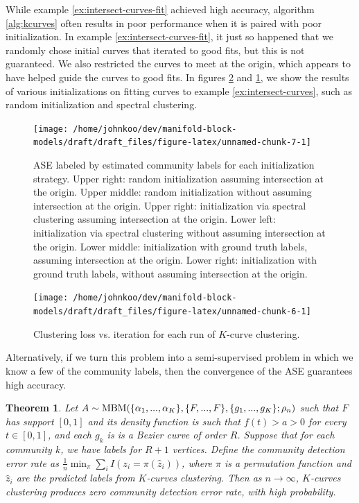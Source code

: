 \documentclass[
  11pt,
]{article}
\newtheorem{theorem}{Theorem}[section]
\theoremstyle{definition}
\theoremstyle{definition}
\theoremstyle{definition}
\theoremstyle{definition}
\theoremstyle{remark}
\begin{document}
While example \ref{ex:intersect-curves-fit} achieved high accuracy, algorithm \ref{alg:kcurves} often results in poor performance when it is paired with poor initialization.
In example \ref{ex:intersect-curves-fit}, it just so happened that we randomly chose initial curves that iterated to good fits, but this is not guaranteed.
We also restricted the curves to meet at the origin, which appears to have helped guide the curves to good fits.
In figures \ref{fig:loss} and \ref{fig:init-strategies}, we show the results of various initializations on fitting curves to example \ref{ex:intersect-curves}, such as random initialization and spectral clustering.

\begin{figure}[H]

{\centering \texttt{[image: /home/johnkoo/dev/manifold-block-models/draft/draft\_files/figure-latex/unnamed-chunk-7-1]} 

}

\caption{ASE labeled by estimated community labels for each initialization strategy. Upper right: random initialization assuming intersection at the origin. Upper middle: random initialization without assuming intersection at the origin. Upper right: initialization via spectral clustering assuming intersection at the origin. Lower left: initialization via spectral clustering without assuming intersection at the origin. Lower middle: initialization with ground truth labels, assuming intersection at the origin. Lower right: initialization with ground truth labels, without assuming intersection at the origin.}\label{fig:init-strategies}
\end{figure}

\begin{figure}

{\centering \texttt{[image: /home/johnkoo/dev/manifold-block-models/draft/draft\_files/figure-latex/unnamed-chunk-6-1]} 

}

\caption{Clustering loss vs. iteration for each run of $K$-curve clustering.}\label{fig:loss}
\end{figure}

Alternatively, if we turn this problem into a semi-supervised problem in which we know a few of the community labels, then the convergence of the ASE guarantees high accuracy.

\begin{theorem}
\label{thm:kcurves-semisupervised}
Let $A \sim \mathrm{MBM}(\{\alpha_1, ..., \alpha_K\}, \{F, ..., F\}, \{g_1, ..., g_K\}; \rho_n)$ such that $F$ has support $[0, 1]$ and its density function is such that $f(t) > a > 0$ for every $t \in [0, 1]$, and each $g_k$ is is a Bezier curve of order $R$. 
Suppose that for each community $k$, we have labels for $R + 1$ vertices. 
Define the community detection error rate as $\frac{1}{n} \min_\pi \sum_i I(z_i = \pi(\hat{z}_i))$, where $\pi$ is a permutation function and $\hat{z}_i$ are the predicted labels from $K$-curves clustering. 
Then as $n \to \infty$, $K$-curves clustering produces zero community detection error rate, with high probability. 
\end{theorem}
\end{document}
